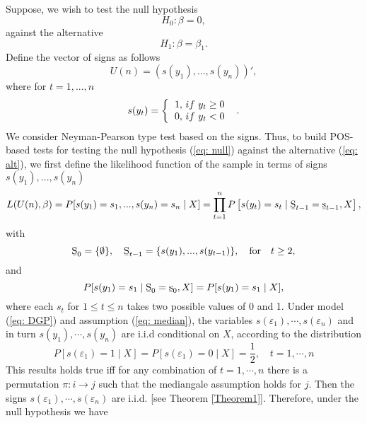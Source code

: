 \documentclass[harvard,11pt]{article}
\begin{document}
Suppose, we wish to test the null hypothesis
\begin{equation}\label{eq: null}
H_0:\beta=0,
\end{equation}
against the alternative
\begin{equation}\label{eq: alt}
H_1:\beta=\beta_1.
\end{equation}
Define the vector of signs as follows
\begin{equation*}
U(n)=(s(y_1),...,s(y_n))',
\end{equation*}
where for $t=1,...,n$
\begin{equation*}
s(y_{t})=\left\{ 
\begin{tabular}{l}
$1,$ $if$ $y_{t}\geq 0$ \\ 
$0,$ $if$ $y_{t}<0$%
\end{tabular}%
\ \right. \text{.}
\end{equation*}
We consider Neyman-Pearson type test based on the signs. Thus, to build POS-based tests for testing the null hypothesis (\ref{eq: null}) against the alternative (\ref{eq: alt}), we first define the likelihood function of the sample in terms of signs $s(y_1),...,s(y_n)$
\begin{equation}\label{eq: likelihood}
L(U(n),\beta)=P[s(y_1)=s_1,...,s(y_n)=s_n\mid X]=\prod\limits_{t=1}^{n}P\left[s(y_t)=s_t\mid \text{\b{S}}_{t-1}=\text{\b{s}}_{t-1},X\right],
\end{equation}
with 
\begin{equation*}
\text{\b{S}}_{0}=\{\emptyset\},\quad \text{\b{S}}_{t-1}=\{s(y_1),...,s(y_{t-1})\},\quad\text{for}\quad t\geq 2,
\end{equation*}
and
\[
P[s(y_1)=s_1\mid\text{\b{S}}_{0}=\text{\b{s}}_{0},X]=P[s(y_1)=s_1\mid X],
\]
where each $s_t$ for $1\leq t\leq n$ takes two possible values of 0 and 1. Under model (\ref{eq: DGP}) and assumption (\ref{eq: median}), the variables $s(\varepsilon_1),\cdots,s(\varepsilon_n)$ and in turn $s(y_1),\cdots,s(y_n)$ are i.i.d conditional on $X$, according to the distribution
\[
P[s(\varepsilon_1)=1\mid X]=P[s(\varepsilon_1)=0\mid X]=\frac{1}{2},\quad t=1,\cdots,n
\]
This results holds true iff  for any combination of $t=1,\cdots,n$ there is a permutation $\pi: i\rightarrow j$ such that the mediangale assumption holds for $j$. Then the signs $s(\varepsilon_1),\cdots,s(\varepsilon_n)$ are i.i.d. [see Theorem \ref{Theorem1}]. Therefore, under the null hypothesis we have
\end{document}
